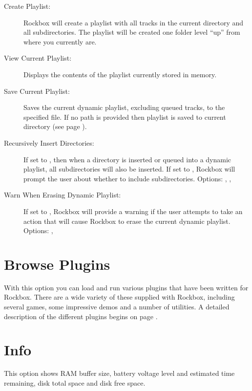 \begin{description}
\item[Create Playlist:]
  Rockbox will create a playlist with all tracks in the current directory 
and all subdirectories. The playlist will be created one folder level ``up'' 
from where you currently are.
  
\item[View Current Playlist:]
  Displays the contents of the playlist currently stored in memory.
  
\item[Save Current Playlist:]
  Saves the current dynamic playlist, excluding queued tracks, to the 
specified file. If no path is provided then playlist is saved to current 
directory (see page \pageref{ref:Playlistsubmenu}).
  
\item[Recursively Insert Directories: ]
  If set to , then when a directory is inserted or queued into a 
  dynamic playlist, all subdirectories will also be inserted. If set to ,
  Rockbox will prompt the user about whether to include subdirectories.
  Options: , , 

\item[Warn When Erasing Dynamic Playlist: ]
  If set to , Rockbox will provide a warning if the user attempts to
  take an action that will cause Rockbox to erase the current dynamic playlist.
  Options: , 
\end{description}

\section{Browse Plugins}
  With this option you can load and run various plugins that have been
written for Rockbox. There are a wide variety of these supplied with
Rockbox, including several games, some impressive demos and a number of
utilities. A detailed description of the different plugins begins 
on page \pageref{ref:plugins}.

\section{\label{ref:Info}Info}
  This option shows RAM buffer size, battery voltage level and estimated time
remaining, disk total space and disk free space.

